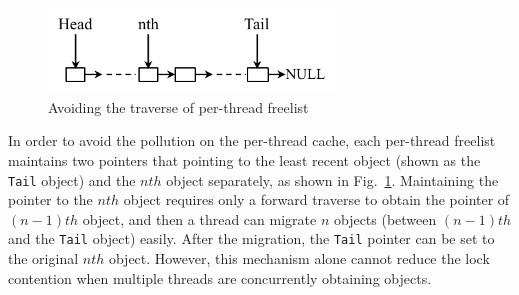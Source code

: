 \begin{figure}
\centering
\includegraphics[width=3in]{figure/perthreadlist}
\vspace{-0.1in}
\caption{Avoiding the traverse of per-thread freelist\label{fig:perthreadlist}}
\vspace{-0.1in}
\end{figure}
In order to avoid the pollution on the per-thread cache, each per-thread freelist maintains two pointers that pointing to the least recent object (shown as the \texttt{Tail} object) and the $nth$ object separately, as shown in Fig.~\ref{fig:perthreadlist}. Maintaining the pointer to the $nth$ object requires only a forward traverse to obtain the pointer of $(n-1)th$ object, and then a thread can migrate $n$ objects (between $(n-1)th$ and the \texttt{Tail} object) easily. 
After the migration,  the \texttt{Tail} pointer can be set to the original $nth$ object. However, this mechanism alone cannot reduce the lock contention when multiple threads are concurrently obtaining objects.

